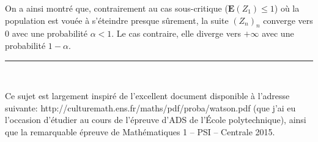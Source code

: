 \documentclass[a4paper,11pt]{article}
\newcommand{\E}{\mathbf{E}}
\newcommand{\suite}[2]{{\left({#1}_{#2}\right)}_{#2}}
\newcommand{\fin}{
	\begin{center}
	\vspace*{2em}
	{\color{vert1}\rule{5cm}{0.2pt}}\\
	\vspace*{1em}
			\sffamily\bfseries{\color{vert1}{FIN DU SUJET}}
	\end{center}
	}
\begin{document}
On a ainsi montré que, contrairement au cas sous-critique ($\E(Z_1)\leq 1$) où la population est vouée à s'éteindre presque sûrement, la suite $\suite{Z}{n}$ converge vers $0$ avec une probabilité $\alpha<1$. Le cas contraire, elle diverge vers $+\infty$ avec une probabilité $1-\alpha$.

\fin
\vspace*{\fill}
\begin{tiny}
Ce sujet est largement inspiré de l'excellent document disponible à l'adresse suivante: http://culturemath.ens.fr/maths/pdf/proba/watson.pdf (que j'ai eu l'occasion d'étudier au cours de l'épreuve d'ADS de l'École polytechnique), ainsi que la remarquable épreuve de Mathématiques 1 – PSI – Centrale 2015.
\end{tiny}
\end{document}
